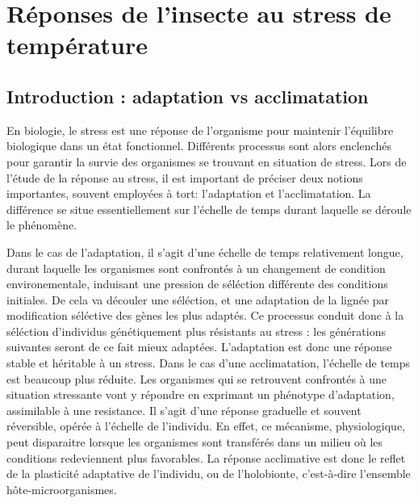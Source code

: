 \chapter{Réponses de l'insecte au stress de température} %
\label{chap:repstress}
	
	\section{Introduction : adaptation vs acclimatation} %
	\label{sec:adaptation_vs_acclimatation}

En biologie, le stress est une réponse de l'organisme pour maintenir l'équilibre
biologique dans un état fonctionnel. Différents processus sont alors enclenchés pour
garantir la survie des organismes se trouvant en situation de stress. Lors de l’étude
de la réponse au stress, il est important de préciser deux notions importantes,
souvent employées à tort: l'adaptation et l'acclimatation. 
La différence se situe essentiellement sur l'échelle de temps durant laquelle
se déroule le phénomène.

Dans le cas de l'adaptation, il s'agit d'une échelle de temps relativement
longue, durant laquelle les organismes sont confrontés à un changement de
condition environementale, induisant une pression de séléction différente des
conditions initiales. De cela va découler une séléction, et une adaptation de
la lignée par modification séléctive des gènes les plus adaptés. 
Ce processus conduit donc à la séléction d'individus génétiquement plus résistants au stress : les générations suivantes seront de ce fait mieux adaptées.
L'adaptation est donc une réponse stable et héritable à un stress.
%
Dans le cas d'une acclimatation, l'échelle de
temps est beaucoup plus réduite. Les organismes qui se retrouvent confrontés à une
situation stressante vont y répondre en exprimant un phénotype
d'adaptation, assimilable à une resistance.
Il s'agit d'une réponse graduelle et souvent réversible, opérée à
l'échelle de l'individu.
En effet, ce mécanisme, physiologique, peut disparaitre lorsque les organismes sont transférés dans un milieu où les conditions redeviennent plus favorables.
La réponse acclimative est donc le reflet de la
plasticité adaptative de l'individu, ou de l'holobionte, c'est-à-dire l'ensemble hôte-microorganismes.

